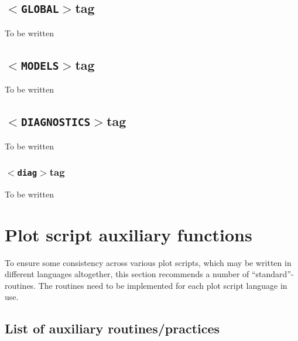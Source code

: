 \documentclass[12pt]{article}
\newcommand{\xmltag}[1]{\texttt{$<$#1$>$}}
\begin{document}
\subsection{\texorpdfstring{\xmltag{GLOBAL}}-tag}
To be written

\subsection{\texorpdfstring{\xmltag{MODELS}}-tag}
To be written

\subsection{\texorpdfstring{\xmltag{DIAGNOSTICS}}-tag}
To be written

\subsubsection{\texorpdfstring{\xmltag{diag}}-tag}
To be written



% 
% 
\section{Plot script auxiliary functions}\label{section:plot_script_aux}
To ensure some consistency across various plot scripts, which may be
written in different languages altogether, this section recommends a number
of ``standard''-routines. The routines need to be implemented for each
plot script language in use.

\subsection{List of auxiliary routines/practices}
\end{document}
